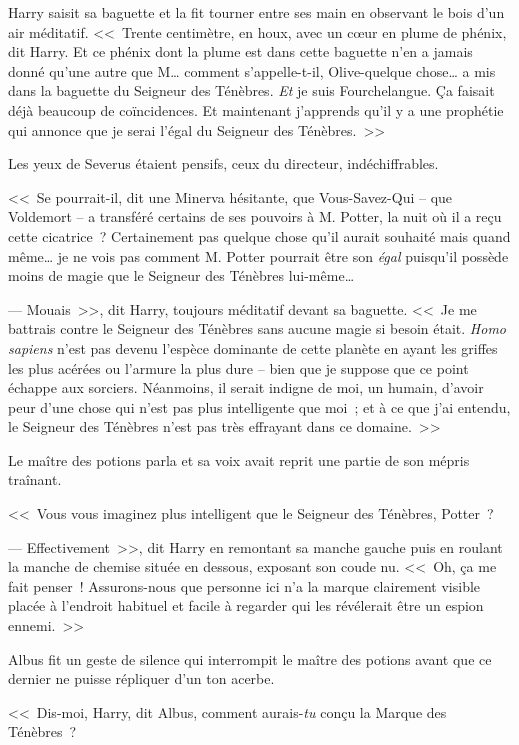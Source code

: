 Harry saisit sa baguette et la fit tourner entre ses main en observant le bois d'un air méditatif. <<~Trente centimètre, en houx, avec un cœur en plume de phénix, dit Harry. Et ce phénix dont la plume est dans cette baguette n'en a jamais donné qu'une autre que M… comment s'appelle-t-il, Olive-quelque chose… a mis dans la baguette du Seigneur des Ténèbres. \emph{Et} je suis Fourchelangue. Ça faisait déjà beaucoup de coïncidences. Et maintenant j'apprends qu'il y a une prophétie qui annonce que je serai l'égal du Seigneur des Ténèbres.~>>

Les yeux de Severus étaient pensifs, ceux du directeur, indéchiffrables.

<<~Se pourrait-il, dit une Minerva hésitante, que Vous-Savez-Qui -- que Voldemort -- a transféré certains de ses pouvoirs à M. Potter, la nuit où il a reçu cette cicatrice~? Certainement pas quelque chose qu'il aurait souhaité mais quand même… je ne vois pas comment M. Potter pourrait être son \emph{égal} puisqu'il possède moins de magie que le Seigneur des Ténèbres lui-même…

--- Mouais~>>, dit Harry, toujours méditatif devant sa baguette. <<~Je me battrais contre le Seigneur des Ténèbres sans aucune magie si besoin était. \emph{Homo sapiens} n'est pas devenu l'espèce dominante de cette planète en ayant les griffes les plus acérées ou l'armure la plus dure -- bien que je suppose que ce point échappe aux sorciers. Néanmoins, il serait indigne de moi, un humain, d'avoir peur d'une chose qui n'est pas plus intelligente que moi~; et à ce que j'ai entendu, le Seigneur des Ténèbres n'est pas très effrayant dans ce domaine.~>>

Le maître des potions parla et sa voix avait reprit une partie de son mépris traînant.

<<~Vous vous imaginez plus intelligent que le Seigneur des Ténèbres, Potter~?

--- Effectivement~>>, dit Harry en remontant sa manche gauche puis en roulant la manche de chemise située en dessous, exposant son coude nu. <<~Oh, ça me fait penser~! Assurons-nous que personne ici n'a la marque clairement visible placée à l'endroit habituel et facile à regarder qui les révélerait être un espion ennemi.~>>

Albus fit un geste de silence qui interrompit le maître des potions avant que ce dernier ne puisse répliquer d'un ton acerbe.

<<~Dis-moi, Harry, dit Albus, comment aurais-\emph{tu} conçu la Marque des Ténèbres~?

